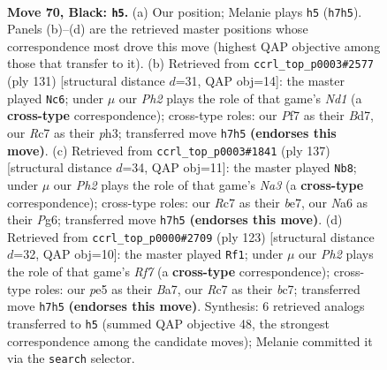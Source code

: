 \documentclass[11pt]{article}
\begin{document}
\clearpage

\begin{figure}[p]\centering
\begin{subfigure}{0.46\textwidth}\centering
\resizebox{\linewidth}{!}{%
\newchessgame
\chessboard[
  setfen={8/2r2p1p/n5p1/4P3/b4Pp1/6N1/3k1K1P/1B6 b - - 31 70},
  showmover=false,
  pgfstyle=straightmove, color=movearrow, markmove={h7-h5}
]}
\caption{}
\end{subfigure}\hfill
\begin{subfigure}{0.46\textwidth}\centering
\resizebox{\linewidth}{!}{%
\newchessgame
\chessboard[
  setfen={3n4/3b4/1k2p2p/4P1p1/6P1/4KN1P/B7/8 b - - 11 66},
  showmover=false,
  pgfstyle=straightmove, color=movearrow, markmove={d8-c6}
]}
\caption{}
\end{subfigure}
\\[4pt]
\begin{subfigure}{0.46\textwidth}\centering
\resizebox{\linewidth}{!}{%
\newchessgame
\chessboard[
  setfen={8/4B3/n5p1/3kbp2/4p3/4P2P/3NK1P1/8 b - - 15 69},
  showmover=false,
  pgfstyle=straightmove, color=movearrow, markmove={a6-b8}
]}
\caption{}
\end{subfigure}\hfill
\begin{subfigure}{0.46\textwidth}\centering
\resizebox{\linewidth}{!}{%
\newchessgame
\chessboard[
  setfen={8/bPB2k2/5p2/3p2p1/1N4P1/1KP5/5r2/8 b - - 16 62},
  showmover=false,
  pgfstyle=straightmove, color=movearrow, markmove={f2-f1}
]}
\caption{}
\end{subfigure}
\caption{\textbf{Move 70, Black: \texttt{h5}.} (a) Our position; Melanie plays \texttt{h5} (\texttt{h7h5}). Panels (b)--(d) are the retrieved master positions whose correspondence most drove this move (highest QAP objective among those that transfer to it). (b) Retrieved from \texttt{ccrl\_top\_p0003\#2577} (ply 131) [structural distance $d$=31, QAP obj=14]: the master played \texttt{Nc6}; under $\mu$ our \emph{Ph2} plays the role of that game's \emph{Nd1} (a \textbf{cross-type} correspondence); cross-type roles: our \emph{P}f7 as their \emph{B}d7, our \emph{R}c7 as their \emph{p}h3; transferred move \texttt{h7h5} \textbf{(endorses this move)}. (c) Retrieved from \texttt{ccrl\_top\_p0003\#1841} (ply 137) [structural distance $d$=34, QAP obj=11]: the master played \texttt{Nb8}; under $\mu$ our \emph{Ph2} plays the role of that game's \emph{Na3} (a \textbf{cross-type} correspondence); cross-type roles: our \emph{R}c7 as their \emph{b}e7, our \emph{N}a6 as their \emph{P}g6; transferred move \texttt{h7h5} \textbf{(endorses this move)}. (d) Retrieved from \texttt{ccrl\_top\_p0000\#2709} (ply 123) [structural distance $d$=32, QAP obj=10]: the master played \texttt{Rf1}; under $\mu$ our \emph{Ph2} plays the role of that game's \emph{Rf7} (a \textbf{cross-type} correspondence); cross-type roles: our \emph{p}e5 as their \emph{B}a7, our \emph{R}c7 as their \emph{b}c7; transferred move \texttt{h7h5} \textbf{(endorses this move)}. Synthesis: 6 retrieved analogs transferred to \texttt{h5} (summed QAP objective 48, the strongest correspondence among the candidate moves); Melanie committed it via the \texttt{search} selector.}
\label{fig:thought-m139}
\end{figure}
\end{document}
